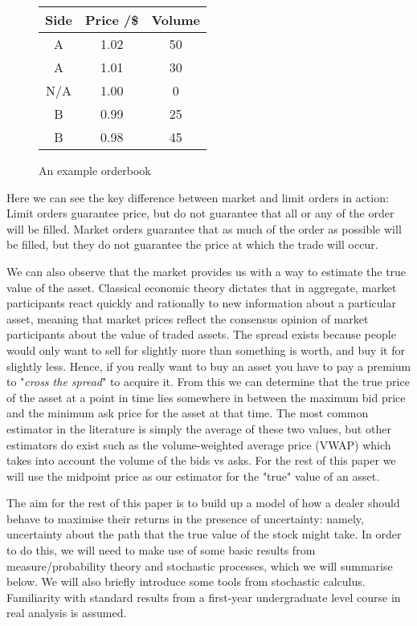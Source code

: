 \begin{figure}
\centering
    \begin{tabular}{ |c|c|c| } 
        \hline
        Side & Price /\$ & Volume \\ 
        \hline
        A & 1.02 & 50 \\
        A & 1.01 & 30 \\
        N/A & 1.00 & 0 \\
        B & 0.99 & 25 \\ 
        B & 0.98 & 45 \\
        \hline
    \end{tabular}
    \caption{An example orderbook}
    \label{fig:orderbook}
\end{figure}

Here we can see the key difference between market and limit orders in action: Limit orders guarantee price, 
but do not guarantee that all or any of the order will be filled. Market orders guarantee that as much of the order as possible will be filled, 
but they do not guarantee the price at which the trade will occur.

We can also observe that the market provides us with a way to estimate the true value of the asset. 
Classical economic theory dictates that in aggregate, market participants react quickly and rationally to new information about a particular asset, 
meaning that market prices reflect the consensus opinion of market participants about the value of traded assets. 
The spread exists because people would only want to sell for slightly more than something is worth, and buy it for slightly less. 
Hence, if you really want to buy an asset you have to pay a premium to "\textit{cross the spread}" to acquire it. 
From this we can determine that the true price of the asset at a point in time lies somewhere in between the maximum bid price and the 
minimum ask price for the asset at that time. The most common estimator in the literature is simply the average of these two values, 
but other estimators do exist such as the volume-weighted average price (VWAP) which takes into account the volume of the bids vs asks. 
For the rest of this paper we will use the midpoint price as our estimator for the "true" value of an asset.

The aim for the rest of this paper is to build up a model of how a dealer should behave to maximise their returns in the presence of uncertainty: 
namely, uncertainty about the path that the true value of the stock might take. 
In order to do this, we will need to make use of some basic results from measure/probability theory and stochastic processes, which we will
summarise below. We will also briefly introduce some tools from stochastic calculus. Familiarity with standard results 
from a first-year undergraduate level course in real analysis is assumed.

